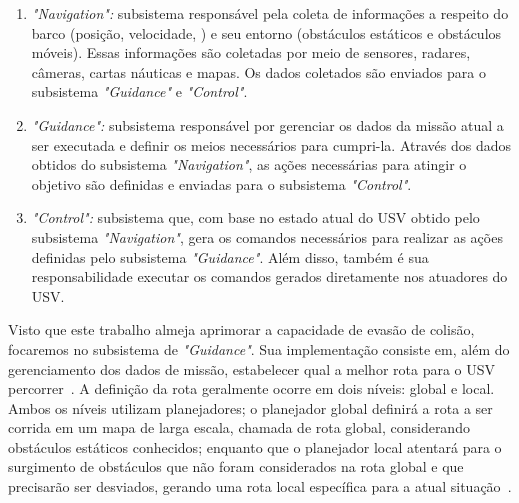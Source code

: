         \begin{enumerate}
            \item \textit{"Navigation":} subsistema responsável pela coleta de informações a respeito do barco (posição, velocidade, \etc) e seu entorno (obstáculos estáticos e obstáculos móveis). Essas informações são coletadas por meio de sensores, radares, câmeras, cartas náuticas e mapas. Os dados coletados são enviados para o subsistema \textit{"Guidance"} e \textit{"Control"}.
            
            \item \textit{"Guidance":} subsistema responsável por gerenciar os dados da missão atual a ser executada e definir os meios necessários para cumpri-la. Através dos dados obtidos do subsistema \textit{"Navigation"}, as ações necessárias para atingir o objetivo são definidas e enviadas para o subsistema \textit{"Control"}.
            
            \item \textit{"Control":} subsistema que, com base no estado atual do USV obtido pelo subsistema \textit{"Navigation"}, gera os comandos necessários para realizar as ações definidas pelo subsistema \textit{"Guidance"}. Além disso, também é sua responsabilidade executar os comandos gerados diretamente nos atuadores do USV.
        \end{enumerate}
        
        Visto que este trabalho almeja aprimorar a capacidade de evasão de colisão, focaremos no subsistema de \textit{"Guidance"}. Sua implementação consiste em, além do gerenciamento dos dados de missão, estabelecer qual a melhor rota para o USV percorrer~\cite{JURAK2020}. A definição da rota geralmente ocorre em dois níveis: global e local. Ambos os níveis utilizam planejadores; o planejador global definirá a rota a ser corrida em um mapa de larga escala, chamada de rota global, considerando obstáculos estáticos conhecidos; enquanto que o planejador local atentará para o surgimento de obstáculos que não foram considerados na rota global e que precisarão ser desviados, gerando uma rota local específica para a atual situação~\cite{LIU201671}.
    
